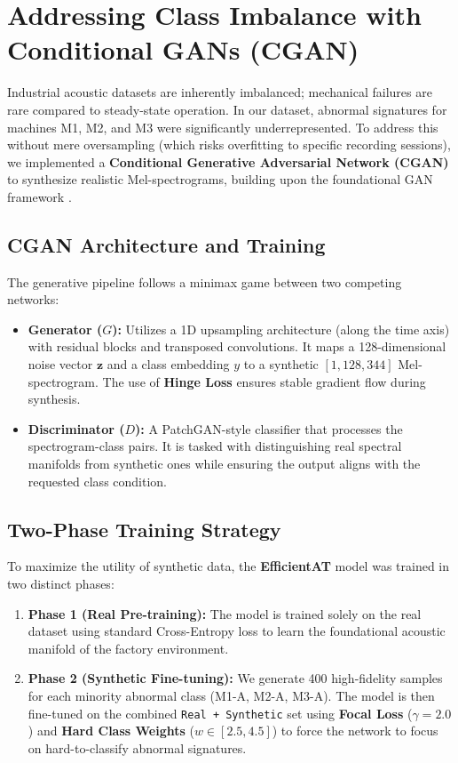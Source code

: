 \section{Addressing Class Imbalance with Conditional GANs (CGAN)}
Industrial acoustic datasets are inherently imbalanced; mechanical failures are rare compared to steady-state operation. In our dataset, abnormal signatures for machines M1, M2, and M3 were significantly underrepresented. To address this without mere oversampling (which risks overfitting to specific recording sessions), we implemented a \textbf{Conditional Generative Adversarial Network (CGAN)} \cite{cgan2014} to synthesize realistic Mel-spectrograms, building upon the foundational GAN framework \cite{goodfellow2014gan}.

\subsection{CGAN Architecture and Training}
The generative pipeline follows a minimax game between two competing networks:
\begin{itemize}
    \item \textbf{Generator ($G$):} Utilizes a 1D upsampling architecture (along the time axis) with residual blocks and transposed convolutions. It maps a 128-dimensional noise vector $\mathbf{z}$ and a class embedding $y$ to a synthetic $[1, 128, 344]$ Mel-spectrogram. The use of \textbf{Hinge Loss} ensures stable gradient flow during synthesis.
    \item \textbf{Discriminator ($D$):} A PatchGAN-style classifier that processes the spectrogram-class pairs. It is tasked with distinguishing real spectral manifolds from synthetic ones while ensuring the output aligns with the requested class condition.
\end{itemize}

\subsection{Two-Phase Training Strategy}
To maximize the utility of synthetic data, the \textbf{EfficientAT} model was trained in two distinct phases:
\begin{enumerate}
    \item \textbf{Phase 1 (Real Pre-training):} The model is trained solely on the real dataset using standard Cross-Entropy loss to learn the foundational acoustic manifold of the factory environment.
    \item \textbf{Phase 2 (Synthetic Fine-tuning):} We generate 400 high-fidelity samples for each minority abnormal class (M1-A, M2-A, M3-A). The model is then fine-tuned on the combined \texttt{Real + Synthetic} set using \textbf{Focal Loss} ($\gamma=2.0$) and \textbf{Hard Class Weights} ($w \in [2.5, 4.5]$) to force the network to focus on hard-to-classify abnormal signatures.
\end{enumerate}

